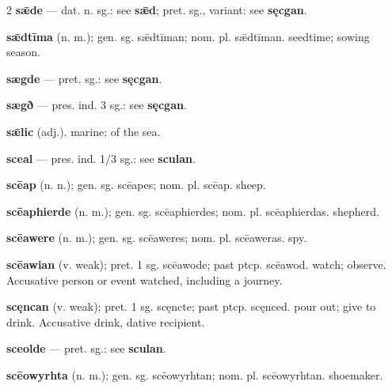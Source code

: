 \begin{multicols*}{2}
\textbf{sǣde} — dat. n. sg.: see \textbf{sǣd}; pret. sg., variant: see \textbf{sęcgan}.\par
\textbf{sǣdtīma} (n. m.); gen. sg. sǣdtīman; nom. pl. sǣdtīman. seedtime; sowing season.\par
\textbf{sægde} — pret. sg.: see \textbf{sęcgan}.\par
\textbf{sægð} — pres. ind. 3 sg.: see \textbf{sęcgan}.\par
\textbf{sǣlic} (adj.). marine; of the sea.\par
\textbf{sceal} — pres. ind. 1/3 sg.: see \textbf{sculan}.\par
\textbf{scēap} (n. n.); gen. sg. scēapes; nom. pl. scēap. sheep.\par
\textbf{scēaphierde} (n. m.); gen. sg. scēaphierdes; nom. pl. scēaphierdas. shepherd.\par
\textbf{scēawere} (n. m.); gen. sg. scēaweres; nom. pl. scēaweras. spy.\par
\textbf{scēawian} (v. weak); pret. 1 sg. scēawode; past ptcp. scēawod. watch; observe. Accusative person or event watched, including a journey.\par
\textbf{scęncan} (v. weak); pret. 1 sg. scęncte; past ptcp. scęnced. pour out; give to drink. Accusative drink, dative recipient.\par
\textbf{sceolde} — pret. sg.: see \textbf{sculan}.\par
\textbf{scēowyrhta} (n. m.); gen. sg. scēowyrhtan; nom. pl. scēowyrhtan. shoemaker.\par

\end{multicols*}
